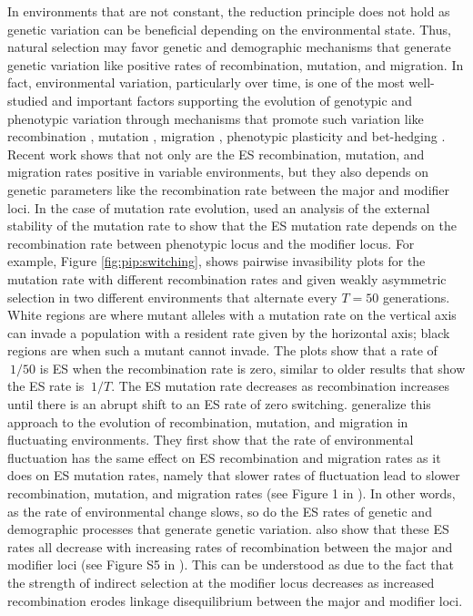 \documentclass[11pt]{article}
\begin{document}
In environments that are not constant, the reduction principle does not hold as genetic variation can be beneficial depending on the environmental state. Thus, natural selection may favor genetic and demographic mechanisms that generate genetic variation like positive rates of recombination, mutation, and migration. In fact, environmental variation, particularly over time, is one of the most well-studied and important factors supporting the evolution of genotypic and phenotypic variation through mechanisms that promote such variation like recombination \cite{Charlesworth:1976,Sasaki:Iwasa:1987,Otto:Michalakis:1998}, mutation \cite{Leigh:1970,Ishii:Matsuda:1989,Lachmann:Jablonka:1996}, migration \cite{Gillespie:1981,McPeek:Holt:1992,Blanquart:Gandon:2011}, phenotypic plasticity \cite{Caswell:1983,Via:Lande:1985,Gavrilets:Scheiner:1993,Jong:1995} and bet-hedging \cite{Slatkin:1974,Seger:Brockmann:1987,Kussell:Leibler:2005,Salathe:VanCleve:2009}. Recent work shows that not only are the ES recombination, mutation, and migration rates positive in variable environments, but they also depends on genetic parameters like the recombination rate between the major and modifier loci. In the case of mutation rate evolution, \citeauthor{Liberman:VanCleve:2011} \cite{Liberman:VanCleve:2011} used an analysis of the external stability of the mutation rate to show that the ES mutation rate depends on the recombination rate between phenotypic locus and the modifier locus. For example, Figure \ref{fig:pip:switching}, shows pairwise invasibility plots for the mutation rate with different recombination rates and given weakly asymmetric selection in two different environments that alternate every $T=50$ generations. White regions are where mutant alleles with a mutation rate on the vertical axis can invade a population with a resident rate given by the horizontal axis; black regions are when such a mutant cannot invade. The plots show that a rate of $~1/50$ is ES when the recombination rate is zero, similar to older results \cite{Leigh:1970,Lachmann:Jablonka:1996} that show the ES rate is $~1/T$. The ES mutation rate decreases as recombination increases until there is an abrupt shift to an ES rate of zero switching. \citeauthor{Carja:Liberman:2014} \cite{Carja:Liberman:2014} generalize this approach to the evolution of recombination, mutation, and migration in fluctuating environments. They first show that the rate of environmental fluctuation has the same effect on ES recombination and migration rates as it does on ES mutation rates, namely that slower rates of fluctuation lead to slower recombination, mutation, and migration rates (see Figure 1 in \cite{Carja:Liberman:2014}). In other words, as the rate of environmental change slows, so do the ES rates of genetic and demographic processes that generate genetic variation. \citeauthor{Carja:Liberman:2014} also show that these ES rates all decrease with increasing rates of recombination between the major and modifier loci (see Figure S5 in \cite{Carja:Liberman:2014}). This can be understood as due to the fact that the strength of indirect selection at the modifier locus decreases as increased recombination erodes linkage disequilibrium between the major and modifier loci.
\end{document}
